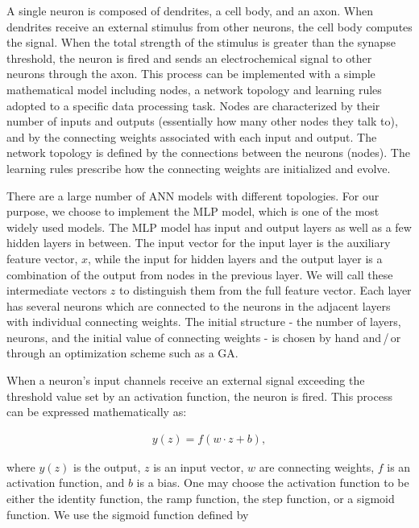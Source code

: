 \documentclass[prd, twocolumn, lengthcheck, superscriptaddress, showpacs, letterpaper, nofootinbib]{revtex4-1}
\newcommand\auxvec{x}
\begin{document}
A single neuron is composed of dendrites, a cell body, and an axon. When dendrites receive an external stimulus from other neurons, the cell body computes the signal. When the total strength of the stimulus is greater than the synapse threshold, the neuron is fired and sends an electrochemical signal to other neurons through the axon. This process can be implemented with a simple mathematical model including nodes, a network topology and learning rules adopted to a specific data processing task. Nodes are characterized by their number of inputs and outputs (essentially how many other nodes they talk to), and by the connecting weights associated with each input and output. The network topology is defined by the connections between the neurons (nodes). The learning rules prescribe how the connecting weights are initialized and evolve.

There are a large number of \ac{ANN} models with different topologies. For our purpose, we choose to implement the \ac{MLP} model, which is one of the most widely used models. The \ac{MLP} model has input and output layers as well as a few hidden layers in between. The input vector for the input layer is the auxiliary feature vector, $\auxvec$, while the input for hidden layers and the output layer is a combination of the output from nodes in the previous layer. We will call these intermediate vectors $z$ to distinguish them from the full feature vector. Each layer has several neurons which are connected to the neurons in the adjacent layers with individual connecting weights. The initial structure - the number of layers, neurons, and the initial value of connecting weights - is chosen by hand and\,/\,or through an optimization scheme such as a \ac{GA}. %

When a neuron's input channels receive an external signal exceeding the threshold value set by an activation function, the neuron is fired. This process can be expressed mathematically as:

\begin{eqnarray}
y(z)=f\left(w \cdot z + b\right),
\end{eqnarray}

\noindent where $y(z)$ is the output, $z$ is an input vector, $w$ are connecting weights, $f$ is an activation function, and $b$ is a bias. One may choose the activation function to be either the identity function, the ramp function, the step function, or a sigmoid function.  We use the sigmoid function defined by 
\end{document}
